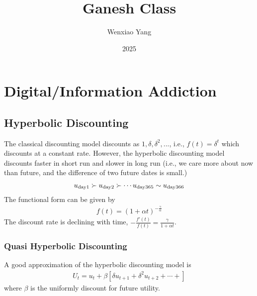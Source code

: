 \documentclass[11pt]{elegantbook}
\title{Ganesh Class}
\author{Wenxiao Yang}
\institute{Haas School of Business, University of California Berkeley}
\date{2025}
\begin{document}
\maketitle

\frontmatter
\tableofcontents

\mainmatter



\chapter{Digital/Information Addiction}
\section{Hyperbolic Discounting}
The classical discounting model discounts as $1,\delta,\delta^2,...$, i.e., $f(t)=\delta^t$ which discounts at a constant rate. However, the hyperbolic discounting model discounts faster in short run and slower in long run (i.e., we care more about now than future, and the difference of two future dates is small.)
\begin{equation}
    \begin{aligned}
        u_\textnormal{day1}\succ u_\textnormal{day2}\succ \cdots u_\textnormal{day365}\sim u_\textnormal{day366}
    \end{aligned}
    \nonumber
\end{equation}
The functional form can be given by
\begin{equation}
    \begin{aligned}
        f(t)=\left(1+\alpha t\right)^{-\frac{\gamma}{\alpha}}
    \end{aligned}
    \nonumber
\end{equation}
The discount rate is declining with time, $-\frac{f'(t)}{f(t)}=\frac{\gamma}{1+\alpha t}$.

\subsection{Quasi Hyperbolic Discounting}
A good approximation of the hyperbolic discounting model is
\begin{equation}
    \begin{aligned}
        U_t=u_t+\beta\left[\delta u_{t+1}+\delta^2 u_{t+2}+\cdots+\right]
    \end{aligned}
    \nonumber
\end{equation}
where $\beta$ is the uniformly discount for future utility.







\end{document}
